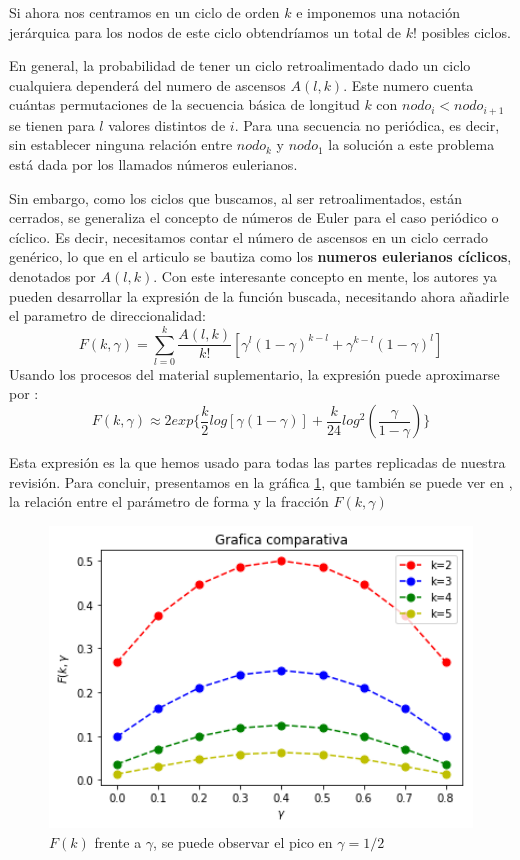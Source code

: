 \documentclass[1p]{elsarticle}
\begin{document}
Si ahora nos centramos en un ciclo de orden $k$ e imponemos una notación jerárquica para los nodos de este ciclo obtendríamos un total de $k!$ posibles ciclos. 

En general, la probabilidad de tener un ciclo retroalimentado dado un ciclo cualquiera dependerá del numero de ascensos $A(l,k)$.
Este numero cuenta cuántas permutaciones de la secuencia básica de longitud $k$ con $nodo_{i}<nodo_{i+1}$ se tienen para $l$ valores distintos de $i$. Para una secuencia no periódica, es decir, sin establecer ninguna relación entre $nodo_k$ y $nodo_1$
la solución a este problema está dada por los llamados números eulerianos.

 Sin embargo, como los ciclos que buscamos, al ser retroalimentados, están cerrados, se  generaliza el concepto de números de Euler para el caso periódico o cíclico. Es decir, necesitamos contar el número de ascensos en un ciclo cerrado genérico, lo que en el articulo se bautiza como los \textbf{numeros eulerianos cíclicos}, denotados por $A(l,k)$.
Con este interesante concepto en mente, los autores ya pueden desarrollar la expresión de la función buscada, necesitando ahora añadirle el parametro de direccionalidad:
$$F(k,\gamma)=\sum_{l=0}^{k}\frac{A(l,k)}{k!}[\gamma^l(1-\gamma)^{k-l}+\gamma^{k-l}(1-\gamma)^l]$$
Usando los procesos del material suplementario, la expresión puede aproximarse por :
$$F(k,\gamma)\approx 2exp\{\frac{k}{2}log[\gamma(1-\gamma)]+\frac{k}{24}log^2(\frac{\gamma}{1-\gamma})\}$$

Esta expresión es la que hemos usado para todas las partes replicadas de nuestra revisión.
Para concluir, presentamos en la gráfica \ref{h}, que también se puede ver en \cite{arti}, la relación entre el parámetro de forma y la fracción $F(k,\gamma)$

\begin{figure}
	\centering
	\includegraphics[width=12cm]{graf_1.png}
	\caption{$F(k)$ frente a $\gamma$, se puede observar el pico en $\gamma=1/2$}
	\label{h}
\end{figure}
\end{document}
